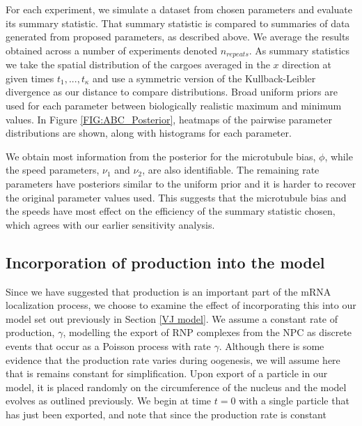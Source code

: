 \documentclass[twocolumn]{biophys}
\begin{document}
For each experiment, we simulate a dataset from chosen parameters and evaluate its summary statistic. 
That summary statistic is compared to summaries of data generated from proposed parameters, as described above.
We average the results obtained across a number of experiments denoted $n_{repeats}$.
As summary statistics we take the spatial distribution of the cargoes averaged in the $x$ direction at given times $t_1,...,t_{\kappa}$ and use a symmetric version of the Kullback-Leibler divergence as our distance to compare distributions.
Broad uniform priors are used for each parameter between biologically realistic maximum and minimum values.
In Figure \ref{FIG:ABC_Posterior}, heatmaps of the pairwise parameter distributions are shown, along with histograms for each parameter. 

We obtain most information from the posterior for the microtubule bias, $\phi$, while the speed parameters, $\nu_1$ and $\nu_2$, are also identifiable. 
The remaining rate parameters have posteriors similar to the uniform prior and it is harder to recover the original parameter values used.
This suggests that the microtubule bias and the speeds have most effect on the efficiency of the summary statistic chosen, which agrees with our earlier sensitivity analysis.

\subsection{Incorporation of production into the model}

Since we have suggested that production is an important part of the mRNA localization process, we choose to examine the effect of incorporating this into our model set out previously in Section \ref{VJ model}.
We assume a constant rate of production, $\gamma$, modelling the export of RNP complexes from the NPC as discrete events that occur as a Poisson process with rate $\gamma$.
Although there is some evidence that the production rate varies during oogenesis, we will assume here that is remains constant for simplification.
Upon export of a particle in our model, it is placed randomly on the circumference of the nucleus and the model evolves as outlined previously.
We begin at time $t=0$ with a single particle that has just been exported, and note that since the production rate is constant 
\end{document}
